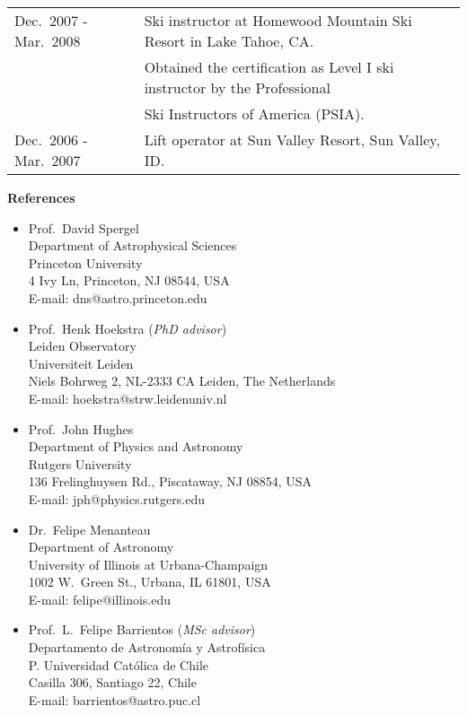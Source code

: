 \documentclass[11pt]{article}
\begin{document}
\begin{table}[h!]
\begin{tabular}{l l}
Dec.~2007 - Mar.~2008 & Ski instructor at Homewood Mountain Ski Resort in Lake Tahoe, CA.\\
                      & Obtained the certification as Level I ski instructor  by the Professional\\
                      & Ski Instructors of America (PSIA).\\
Dec.~2006 - Mar.~2007 & Lift operator at Sun Valley Resort, Sun Valley, ID.
\end{tabular}
\end{table}


\pagebreak

\noindent
{\bf\Large References}
\begin{itemize}
 \item Prof.~David Spergel\\
       Department of Astrophysical Sciences\\
       Princeton University\\
       4 Ivy Ln, Princeton, NJ 08544, USA\\
       E-mail: dns@astro.princeton.edu
 \item Prof.~Henk Hoekstra (\textit{PhD advisor})\\
       Leiden Observatory\\
       Universiteit Leiden\\
       Niels Bohrweg 2, NL-2333 CA Leiden, The Netherlands\\
       E-mail: hoekstra@strw.leidenuniv.nl
 \item Prof.~John Hughes\\
       Department of Physics and Astronomy\\
       Rutgers University\\
       136 Frelinghuysen Rd., Piscataway, NJ 08854, USA\\
       E-mail: jph@physics.rutgers.edu
 \item Dr.~Felipe Menanteau\\
       Department of Astronomy\\
       University of Illinois at Urbana-Champaign\\
       1002 W.\ Green St., Urbana, IL 61801, USA\\
       E-mail: felipe@illinois.edu
 \item Prof.~L.~Felipe Barrientos (\textit{MSc advisor})\\
       Departamento de Astronom\'ia y Astrof\'isica\\
       P. Universidad Cat\'olica de Chile\\
       Casilla 306, Santiago 22, Chile\\
       E-mail: barrientos@astro.puc.cl
\end{itemize}



% 
\end{document}
